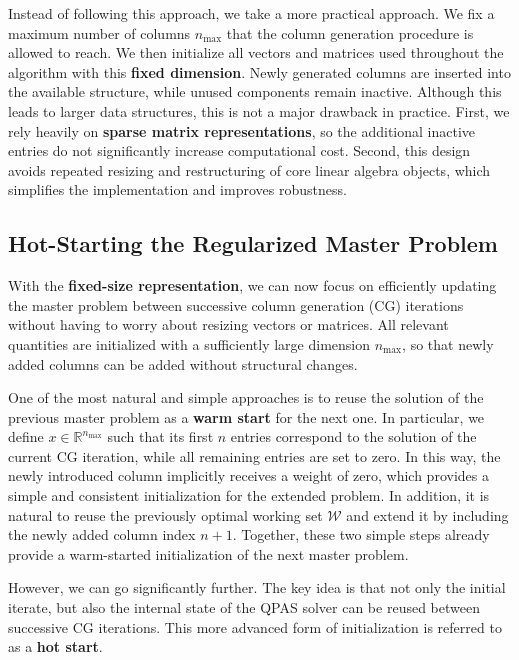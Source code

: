 \documentclass{book}
\theoremstyle{definition}
\newcounter{algorithm_}
\numberwithin{algorithm_}{chapter}
\begin{document}
{\bigskip

Instead of following this approach, we take a more practical approach. We fix a maximum number of columns $n_{\max}$ that the column generation procedure is allowed to reach. We then initialize all vectors and matrices used throughout the algorithm with this \textbf{fixed dimension}. Newly generated columns are inserted into the available structure, while unused components remain inactive.
Although this leads to larger data structures, this is not a major drawback in practice. First, we rely heavily on \textbf{sparse matrix representations}, so the additional inactive entries do not significantly increase computational cost. Second, this design avoids repeated resizing and restructuring of core linear algebra objects, which simplifies the implementation and improves robustness.

\newpage

\subsection{Hot-Starting the Regularized Master Problem}

With the \textbf{fixed-size representation}, we can now focus on efficiently updating the master problem between successive column generation (CG) iterations without having to worry about resizing vectors or matrices. All relevant quantities are initialized with a sufficiently large dimension $n_{\max}$, so that newly added columns can be added without structural changes.

\bigskip

One of the most natural and simple approaches is to reuse the solution of the previous master problem as a \textbf{warm start} for the next one. In particular, we define $x \in \mathbb{R}^{n_{\max}}$ such that its first $n$ entries correspond to the solution of the current CG iteration, while all remaining entries are set to zero. In this way, the newly introduced column implicitly receives a weight of zero, which provides a simple and consistent initialization for the extended problem.
In addition, it is natural to reuse the previously optimal working set $\mathcal{W}$ and extend it by including the newly added column index $n+1$. Together, these two simple steps already provide a warm-started initialization of the next master problem.

\bigskip

However, we can go significantly further. The key idea is that not only the initial iterate, but also the internal state of the QPAS solver can be reused between successive CG iterations. This more advanced form of initialization is referred to as a \textbf{hot start}.

}
\end{document}
